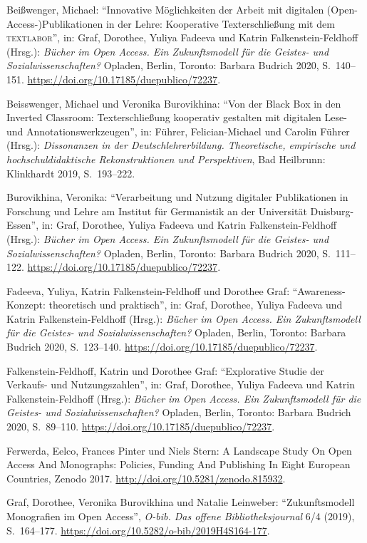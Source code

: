 \documentclass[a4paper,
fontsize=11pt,
oneside,
numbers=noperiodatend,
parskip=half-,
bibliography=totoc,
final
]{scrartcl}
\begin{document}
Beißwenger, Michael: \enquote{Innovative Möglichkeiten der Arbeit mit digitalen
(Open-Access-)Publi\-kationen in der Lehre: Kooperative Texterschließung
mit dem \textsc{textlabor}}, in: Graf, Dorothee, Yuliya Fadeeva und
Katrin Falkenstein-Feldhoff (Hrsg.): \emph{Bücher im Open Access. Ein
Zukunftsmodell für die Geistes- und Sozialwissenschaften?} Opladen,
Berlin, Toronto: Barbara Budrich 2020, S.~140--151.
\url{https://doi.org/10.17185/duepublico/72237}.

Beisswenger, Michael und Veronika Burovikhina: \enquote{Von der Black Box in
den Inverted Classroom: Texterschließung kooperativ gestalten mit
digitalen Lese- und Annotationswerkzeugen}, in: Führer,
Felician-Michael und Carolin Führer (Hrsg.): \emph{Dissonanzen in der
Deutschlehrerbildung. Theoretische, empirische und hochschuldidaktische
Rekonstruktionen und Perspektiven}, Bad Heilbrunn: Klinkhardt 2019,
S.~193--222.

Burovikhina, Veronika: \enquote{Verarbeitung und Nutzung digitaler
Publikationen in Forschung und Lehre am Institut für Germanistik an der
Universität Duisburg-Essen}, in: Graf, Dorothee, Yuliya Fadeeva und
Katrin Falkenstein-Feldhoff (Hrsg.): \emph{Bücher im Open Access. Ein
Zukunftsmodell für die Geistes- und Sozialwissenschaften?} Opladen,
Berlin, Toronto: Barbara Budrich 2020, S.~111--122.
\url{https://doi.org/10.17185/duepublico/72237}.

Fadeeva, Yuliya, Katrin Falkenstein-Feldhoff und Dorothee Graf:
\enquote{Awareness-Konzept: theoretisch und praktisch}, in: Graf, Dorothee,
Yuliya Fadeeva und Katrin Falkenstein-Feldhoff (Hrsg.): \emph{Bücher im
Open Access. Ein Zukunftsmodell für die Geistes- und
Sozialwissenschaften?} Opladen, Berlin, Toronto: Barbara Budrich 2020,
S.~123--140. \url{https://doi.org/10.17185/duepublico/72237}.

Falkenstein-Feldhoff, Katrin und Dorothee Graf: \enquote{Explorative Studie der
Verkaufs- und Nutzungszahlen}, in: Graf, Dorothee, Yuliya Fadeeva und
Katrin Falkenstein-Feldhoff (Hrsg.): \emph{Bücher im Open Access. Ein
Zukunftsmodell für die Geistes- und Sozialwissenschaften?} Opladen,
Berlin, Toronto: Barbara Budrich 2020, S.~89--110.
\url{https://doi.org/10.17185/duepublico/72237}.

Ferwerda, Eelco, Frances Pinter und Niels Stern: A Landscape Study On
Open Access And Monographs: Policies, Funding And Publishing In Eight
European Countries, Zenodo 2017.
\url{http://doi.org/10.5281/zenodo.815932}.

Graf, Dorothee, Veronika Burovikhina und Natalie Leinweber:
\enquote{Zukunftsmodell Monografien im Open Access}, \emph{O-bib. Das offene
Bibliotheksjournal} 6/4 (2019), S.~164--177.
\url{https://doi.org/10.5282/o-bib/2019H4S164-177}.
\end{document}
